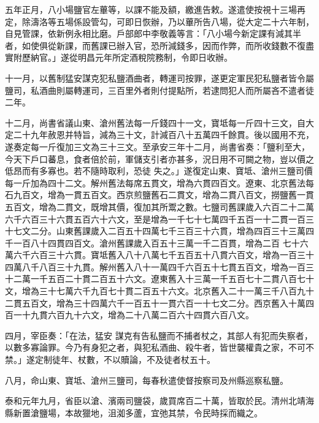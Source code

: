 \begin{pinyinscope}
 五年正月，八小場鹽官左蓽等，以課不能及額，繳進告敕。遂遣使按視十三場再定，除濤洛等五場係設管勾，可即日恢辦，乃以蓽所告八場，從大定二十六年制，自見管課，依新例永相比磨。戶部郎中李敬義等言：「八小場今新定課有減其半者，如使俱從新課，而舊課已辦入官，恐所減錢多，因而作弊，而所收錢數不復盡實附歷納官。」遂從明昌元年所定酒稅院務制，令即日收辦。



 十一月，以舊制猛安謀克犯私鹽酒曲者，轉運司按罪，遂更定軍民犯私鹽者皆令屬鹽司，私酒曲則屬轉運司，三百里外者則付提點所，若逮問犯人而所屬吝不遣者徒二年。



 十二月，尚書省議山東、滄州舊法每一斤錢四十一文，寶坻每一斤四十三文，自大定二十九年赦恩并特旨，減為三十文，計減百八十五萬四千餘貫。後以國用不充，遂奏定每一斤復加三文為三十三文。至承安三年十二月，尚書省奏：「鹽利至大，今天下戶口蕃息，食者倍於前，軍儲支引者亦甚多，況日用不可闕之物，豈以價之低昂而有多寡也。若不隨時取利，恐徒
 失之。」遂復定山東、寶坻、滄州三鹽司價每一斤加為四十二文。解州舊法每席五貫文，增為六貫四百文。遼東、北京舊法每石九百文，增為一貫五百文。西京煎鹽舊石二貫文，增為二貫八百文，撈鹽舊一貫五百文，增為二貫文，既增其價，復加其所鬻之數。七鹽司舊課歲入六百二十二萬六千六百三十六貫五百六十六文，至是增為一千七十七萬四千五百一十二貫一百三十七文二分。山東舊課歲入二百五十四萬七千三百三十六貫，增為四百三十三萬四千一百八十四貫四百文。滄州舊課歲入百五十三萬一千二百貫，增為二百
 七十六萬六千六百三十六貫。寶坻舊入八十八萬七千五百五十八貫六百文，增為一百三十四萬八千八百三十九貫。解州舊入八十一萬四千六百五十七貫五百文，增為一百三十二萬一千五百二十貫二百五十六文。遼東舊入十三萬一千五百七十二貫八百七十文，增為三十七萬六千九百七十貫二百五十六文。北京舊入二十一萬三千八百九十二貫五百文，增為三十四萬六千一百五十一貫六百一十七文二分。西京舊入十萬四百一十九貫六百九十六文，增為二十八萬二百六十四貫六百八文。



 四月，宰臣奏：「在法，猛安
 謀克有告私鹽而不捕者杖之，其部人有犯而失察者，以數多寡論罪。今乃有身犯之者，與犯私酒曲、殺牛者，皆世襲權貴之家，不可不禁。」遂定制徒年、杖數，不以贖論，不及徒者杖五十。



 八月，命山東、寶坻、滄州三鹽司，每春秋遣使督按察司及州縣巡察私鹽。



 泰和元年九月，省臣以滄、濱兩司鹽袋，歲買席百二十萬，皆取於民。清州北靖海縣新置滄鹽場，本故獵地，沮洳多蘆，宜弛其禁，令民時採而織之。




\end{pinyinscope}
